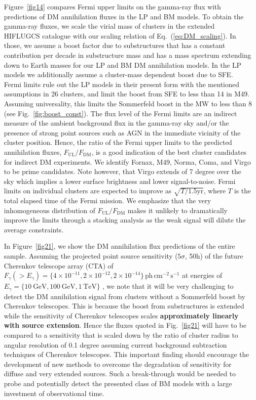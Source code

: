 \documentclass[10pt,aps,pra,reprint,amsmath,amsfonts,amssymb,showpacs,nofootinbib,floatfix]{revtex4-1}
\def\C#1{{\bf #1}}
\newcommand{\rmn}{\mathrm}
\begin{document}
Figure~\ref{fig14} compares Fermi upper limits on the gamma-ray flux
with predictions of DM annihilation fluxes in the LP and BM models.
To obtain the gamma-ray fluxes, we scale the virial mass of clusters
in the extended HIFLUGCS catalogue \cite{2002ApJ...567..716R} with our
scaling relation of Eq.~(\ref{eq:DM_scaling}). In those, we assume a
boost factor due to substructures that has a constant contribution per
decade in substructure mass and has a mass spectrum extending down to
Earth masses for our LP and BM DM annihilation models. In the LP
models we additionally assume a cluster-mass dependent boost due to
SFE. Fermi limits rule out the LP models in their present form with
the mentioned assumptions in 26 clusters, and limit the boost from SFE
to less than 14 in M49. Assuming universality, this limits the
Sommerfeld boost in the MW to less than 8 (see
Fig.~\ref{fig:boost_const}).  The flux level of the Fermi limits are
an indirect measure of the ambient background flux in the gamma-ray
sky and/or the presence of strong point sources such as AGN in the
immediate vicinity of the cluster position. Hence, the ratio of the
Fermi upper limits to the predicted annihilation fluxes,
$F_{\mathrm{UL}}/F_{\mathrm{DM}}$, is a good indication of the best
cluster candidates for indirect DM experiments. We identify Fornax,
M49, Norma, Coma, and Virgo to be prime candidates. Note however, that
Virgo extends of 7 degree over the sky which implies a lower surface
brightness and lower signal-to-noise.  Fermi limits on individual
clusters are expected to improve as $\sqrt{T/1.5 \mathrm{yr}}$, where
$T$ is the total elapsed time of the Fermi mission. We emphasize that
the very inhomogeneous distribution of $F_{\mathrm{UL}}/
F_{\mathrm{DM}}$ makes it unlikely to dramatically improve the limits
through a stacking analysis as the weak signal will dilute the average
constraints.

In Figure~\ref{fig21}, we show the DM annihilation flux predictions of
the entire sample.  Assuming the projected point source sensitivity
($5\sigma$, 50h) of the future Cherenkov telescope array (CTA) of
$F_\gamma(>E_\gamma) = \{4\times10^{-11}, 2\times10^{-12},
2\times10^{-14}\}\,\rmn{ph}\,\rmn{cm}^{-2}\,\rmn{s}^{-1}$ at energies
of $E_\gamma=\{10~\rmn{GeV}, 100~\rmn{GeV}, 1~\rmn{TeV}\}$
\cite{Doro:2009qs}, we note that it will be very challenging to detect
the DM annihilation signal from clusters without a Sommerfeld boost by
Cherenkov telescopes.  This is because the boost from substructures is
extended while the sensitivity of Cherenkov telescopes scales
\C{approximately linearly with source extension}. Hence the fluxes
quoted in Fig.~\ref{fig21} will have to be compared to a sensitivity
that is scaled down by the ratio of cluster radius to angular
resolution of 0.1 degree assuming current background subtraction
techniques of Cherenkov telescopes. This important finding should
encourage the development of new methods to overcome the degradation
of sensitivity for diffuse and very extended sources. Such a
break-through would be needed to probe and potentially detect the
presented class of BM models with a large investment of observational
time.
\end{document}
